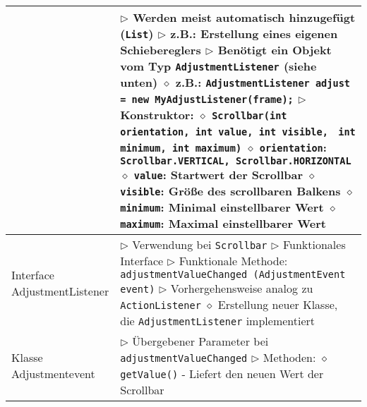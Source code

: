 \begin{longtable}{ | p{} p{} | }
	\makecell[l]{Klasse Scrollbar} & \makecell[l]{
	$\triangleright$ Werden meist automatisch hinzugefügt (\texttt{List}) \\
	$\triangleright$ z.B.: Erstellung eines eigenen Schiebereglers \\
	$\triangleright$ Benötigt ein Objekt vom Typ \texttt{AdjustmentListener} (siehe unten) \\
	\hspace{0.4cm} $\diamond$ z.B.: \texttt{AdjustmentListener adjust = new MyAdjustListener(frame);} \\
	$\triangleright$ Konstruktor: \\
	\hspace{0.4cm} $\diamond$ \texttt{Scrollbar(int orientation, int value, int visible,} \\
	\hspace{2.5cm} \texttt{ int minimum, int maximum)} \\
	\hspace{0.4cm} $\diamond$ \texttt{orientation}: \texttt{Scrollbar.VERTICAL, Scrollbar.HORIZONTAL} \\
	\hspace{0.4cm} $\diamond$ \texttt{value}: Startwert der Scrollbar \\
	\hspace{0.4cm} $\diamond$ \texttt{visible}: Grö\ss e des scrollbaren Balkens \\
	\hspace{0.4cm} $\diamond$ \texttt{minimum}: Minimal einstellbarer Wert \\
	\hspace{0.4cm} $\diamond$ \texttt{maximum}: Maximal einstellbarer Wert} \\ \hline

	\makecell[l]{Interface \\ AdjustmentListener} & \makecell[l]{
	$\triangleright$ Verwendung bei \texttt{Scrollbar} \\
	$\triangleright$ Funktionales Interface \\
	$\triangleright$ Funktionale Methode: \texttt{adjustmentValueChanged (AdjustmentEvent event)} \\
	$\triangleright$ Vorhergehensweise analog zu \texttt{ActionListener} \\
	\hspace{0.4cm} $\diamond$ Erstellung neuer Klasse, die \texttt{AdjustmentListener} implementiert} \\ \hline

	\makecell[l]{Klasse \\ Adjustmentevent} & \makecell[l]{$\triangleright$ Übergebener Parameter bei \texttt{adjustmentValueChanged} \\
	$\triangleright$ Methoden: \\
	\hspace{0.4cm} $\diamond$ \texttt{getValue()} \\
	\hspace{0.6cm} - Liefert den neuen Wert der Scrollbar} \\ \hline


\end{longtable}
